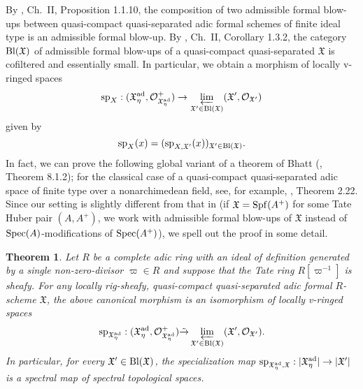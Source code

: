 \documentclass[12pt,twoside,a4paper]{article}
\newtheorem{thm}{Theorem}[section]
\theoremstyle{definition}
\theoremstyle{remark}
\newcommand\ad{{\rm ad}}
\newcommand\Bl{{\rm Bl}}
\newcommand\spc{{\rm sp}}
\newcommand\Spec{{\rm Spec}}
\newcommand\Spf{{\rm Spf}}
\begin{document}
By \cite{FK}, Ch.~II, Proposition 1.1.10, the composition of two admissible formal blow-ups between quasi-compact quasi-separated adic formal schemes of finite ideal type is an admissible formal blow-up. By \cite{FK}, Ch.~II, Corollary 1.3.2, the category $\Bl(\mathfrak{X})$ of admissible formal blow-ups of a quasi-compact quasi-separated $\mathfrak{X}$ is cofiltered and essentially small. In particular, we obtain a morphism of locally v-ringed spaces \begin{equation*}\spc_{X}: (\mathfrak{X}_{\eta}^{\ad}, \mathcal{O}_{\mathfrak{X}_{\eta}^{\ad}}^{+})\to\varprojlim_{\mathfrak{X}'\in \Bl(\mathfrak{X})} (\mathfrak{X}', \mathcal{O}_{\mathfrak{X}'})\end{equation*}given by \begin{equation*}\spc_{X}(x)=(\spc_{X,\mathfrak{X}'}(x))_{\mathfrak{X}'\in\Bl(\mathfrak{X})}.\end{equation*}In fact, we can prove the following global variant of a theorem of Bhatt (\cite{BhattNotes}, Theorem 8.1.2); for the classical case of a quasi-compact quasi-separated adic space of finite type over a nonarchimedean field, see, for example, \cite{Scholze}, Theorem 2.22. Since our setting is slightly different from that in \cite{BhattNotes} (if $\mathfrak{X}=\Spf(A^{+})$ for some Tate Huber pair $(A, A^{+})$, we work with admissible formal blow-ups of $\mathfrak{X}$ instead of $\Spec(A)$-modifications of $\Spec(A^{+})$), we spell out the proof in some detail.
\begin{thm}\label{Generic fiber via formal blow-ups}Let $R$ be a complete adic ring with an ideal of definition generated by a single non-zero-divisor $\varpi\in R$ and suppose that the Tate ring $R[\varpi^{-1}]$ is sheafy. For any locally rig-sheafy, quasi-compact quasi-separated adic formal $R$-scheme $\mathfrak{X}$, the above canonical morphism is an isomorphism of locally v-ringed spaces\begin{equation*}\spc_{\mathfrak{X}_{\eta}^{\ad}}: (\mathfrak{X}_{\eta}^{\ad}, \mathcal{O}_{\mathfrak{X}_{\eta}^{\ad}}^{+})\tilde{\rightarrow}\varprojlim_{\mathfrak{X}'\in \Bl(\mathfrak{X})} (\mathfrak{X}', \mathcal{O}_{\mathfrak{X}'}).\end{equation*}In particular, for every $\mathfrak{X}'\in\Bl(\mathfrak{X})$, the specialization map $\spc_{\mathfrak{X}_{\eta}^{\ad},\mathfrak{X}}: \vert\mathfrak{X}_{\eta}^{\ad}\vert\to \vert\mathfrak{X}'\vert$ is a spectral map of spectral topological spaces.\end{thm}
\end{document}
